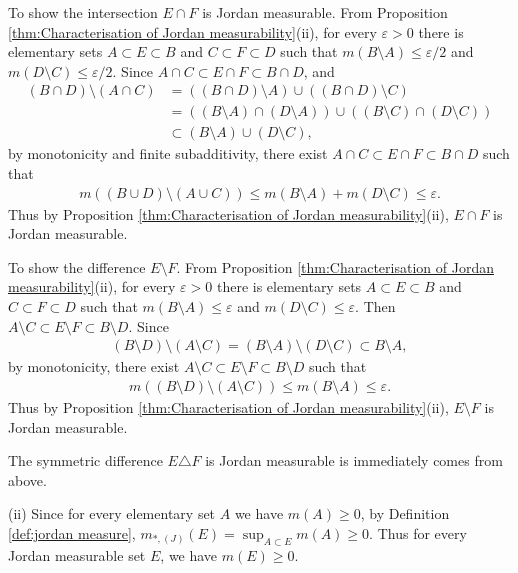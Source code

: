 \documentclass{book}
\theoremstyle{defstyle}
\theoremstyle{thmstyle}
\newcommand{\JIM}{m_{*, (J)}}%
\newcounter{Proposition}[section]
\begin{document}
To show the intersection $E \cap F$ is Jordan measurable. From Proposition \ref{thm:Characterisation of Jordan measurability}(ii), for every $\varepsilon > 0$ there is elementary sets $A \subset E \subset B$ and $C \subset F \subset D$ such that $m(B \setminus A) \leq \varepsilon/2$ and $m(D \setminus C) \leq \varepsilon/2$. Since $A \cap C \subset E \cap F \subset B \cap D$, and
    \begin{align*}
        (B \cap D) \setminus (A \cap C)
        &= ((B \cap D)\setminus A) \cup ((B \cap D) \setminus C)\\
        &= ((B \setminus A) \cap (D \setminus A)) \cup ((B \setminus C) \cap (D \setminus C))\\
        &\subset (B \setminus A) \cup (D \setminus C),
    \end{align*}
by monotonicity and finite subadditivity, there exist $A \cap C \subset E \cap F \subset B \cap D$ such that
    \begin{align*}
        m((B \cup D) \setminus (A \cup C))
        \leq m(B \setminus A) + m(D \setminus C) \leq \varepsilon.
    \end{align*}
Thus by Proposition \ref{thm:Characterisation of Jordan measurability}(ii), $E \cap F$ is Jordan measurable.

To show the difference $E \setminus F$. From Proposition \ref{thm:Characterisation of Jordan measurability}(ii), for every $\varepsilon > 0$ there is elementary sets $A \subset E \subset B$ and $C \subset F \subset D$ such that $m(B \setminus A) \leq \varepsilon$ and $m(D \setminus C) \leq \varepsilon$. Then $A \setminus C \subset E \setminus F \subset B \setminus D$. Since
    \begin{align*}
        (B \setminus D) \setminus (A \setminus C)
        = (B \setminus A) \setminus (D \setminus C)
        \subset B \setminus A,
    \end{align*}
by monotonicity, there exist $A \setminus C \subset E \setminus F \subset B \setminus D$ such that
\begin{align*}
    m((B \setminus D) \setminus (A \setminus C))
    \leq m(B \setminus A) \leq \varepsilon.
\end{align*}
Thus by Proposition \ref{thm:Characterisation of Jordan measurability}(ii), $E \setminus F$ is Jordan measurable.

The symmetric difference $E \triangle F$ is Jordan measurable is immediately comes from above.

(ii) Since for every elementary set $A$ we have $m(A) \geq 0$, by Definition \ref{def:jordan measure}, $\JIM(E) = \sup_{A \subset E} m(A) \geq 0$. Thus for every Jordan measurable set $E$, we have $m(E) \geq 0$.
\end{document}
